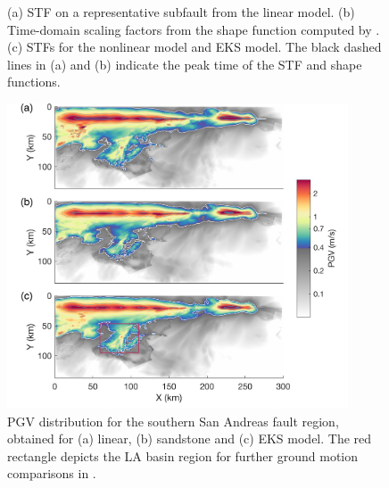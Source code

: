 \clearpage
\begin{figure}[!ht]
     \hfil
     \hfil
    \caption{(a) STF on a representative subfault from the linear model. (b) Time-domain scaling factors from the shape function computed by . (c) STFs for the nonlinear model and EKS model. The black dashed lines in (a) and (b) indicate the peak time of the STF and shape functions.}
    \label{fig:eks-3}
\end{figure}
\clearpage

\clearpage
\begin{figure}[!ht]
    \includegraphics[width=0.9\textwidth]{figures/figure_eks_4.png}
    \caption{PGV distribution for the southern San Andreas fault region, obtained for (a) linear, (b) sandstone and (c) EKS model. The red rectangle depicts the LA basin region for further ground motion comparisons in .}
    \label{fig:eks-4}
\end{figure}


